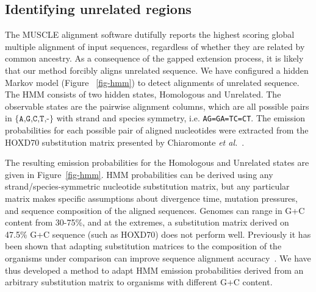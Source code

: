 \documentclass[9.5pt,journal,final,finalsubmission,twocolumn]{IEEEtran}
\begin{document}
\subsection{Identifying unrelated regions}
\begin{figure*}[t!]
\centering {}
\caption[Hidden Markov model used to detect pairwise alignments of unrelated
sequence]%
{\textbf{Hidden Markov model used to detect pairwise alignments of unrelated
sequence.} The HMM has states which model alignment columns containing
homologous and unrelated sequence. Emission probabilities are extracted from the HOXD70 substitution matrix and correspond to alignment
columns, for example \texttt{AA} indicates A aligned to A.  gO
indicates gap-open and gE gap extend. Alignment columns are treated as
strand-symmetric, so that AC also indicates CA and the reverse
complements TG and GT.  The emission probabilities are adjusted to the G+C content of the input genome
as described in the test.  The values shown here correspond to a 47.5\% G+C genome.}
\label{fig-hmm}
\end{figure*}
The MUSCLE alignment software dutifully reports the highest scoring
global multiple alignment of input sequences, regardless of whether
they are related by common ancestry. As a consequence of the gapped
extension process, it is likely that our method forcibly aligns unrelated
sequence. We have configured a hidden Markov model (Figure
~\ref{fig-hmm}) to detect alignments of unrelated sequence. The HMM
consists of two hidden states, Homologous and Unrelated. The
observable states are the pairwise alignment columns, which are all
possible pairs in $\texttt{{\{A,G,C,T,-\}}}$ with strand and species
symmetry, i.e. \texttt{AG=GA=TC=CT}. The emission probabilities for
each possible pair of aligned nucleotides were extracted from the HOXD70
substitution matrix presented by Chiaromonte \textit{et al.}~\cite{hoxd}.

The resulting emission
probabilities for the Homologous and Unrelated states are given
in Figure~\ref{fig-hmm}. HMM probabilities can be derived using any strand/species-symmetric nucleotide substitution matrix,
but any particular matrix makes specific assumptions about divergence time, mutation pressures,
and sequence composition of the aligned sequences.
Genomes can range in G+C content from 30-75\%, and at the extremes,
a substitution matrix derived on 47.5\% G+C sequence (such as HOXD70) does not
perform well. Previously it has been shown that adapting substitution matrices to the composition
of the organisms under comparison can improve sequence alignment accuracy~\cite{ref-rev3b}.  We have thus developed a method to adapt HMM emission
probabilities derived from an arbitrary substitution matrix
to organisms with different G+C content.
\end{document}
